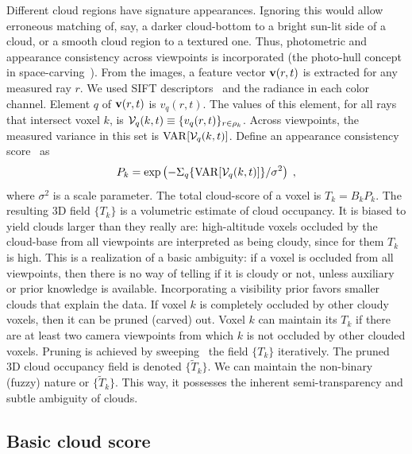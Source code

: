 \documentclass[runningheads]{llncs}
\begin{document}
Different cloud regions have signature appearances. Ignoring this would allow erroneous matching of, say, a darker cloud-bottom to a bright sun-lit side of a cloud, or a smooth cloud region to a textured one. Thus, photometric and appearance consistency across viewpoints is incorporated (the photo-hull concept in space-carving~\cite{Kutulakos2000}).
From the images, a feature vector ${\bf v}(r,t)$ is extracted for any measured ray $r$.
We used SIFT descriptors~\cite{lowe2004distinctive} and the radiance in each color channel. Element $q$ of ${\bf v}(r,t)$ is $v_q(r,t)$. The values of this element, for all rays that intersect voxel $k$, is \mbox{${\cal V}_q(k,t)\equiv\{v_q(r,t)\}_{r\in\rho_k}$}.
Across viewpoints, the measured variance in this set is
${\rm VAR}[{\cal V}_q(k,t)]$. Define an appearance consistency score~\cite{Supp2014} as
\begin{equation}
 P_k= \exp\left(
         -\Sigma_q\{{\rm VAR}[{\cal V}_q(k,t)]\}/\sigma^2
         \right)
  \;,
 \label{eq:Dist}
\end{equation}
where $\sigma^2$ is a scale parameter. The total cloud-score of a voxel is \mbox{$T_k=B_kP_k$}.
The resulting 3D field $\{T_k\}$ is a volumetric estimate of cloud occupancy. It is biased to yield clouds larger than they really are: high-altitude voxels occluded by the cloud-base from all viewpoints are interpreted as being cloudy, since for them $T_k$ is high. This is a realization of a basic ambiguity: if a voxel is occluded from all viewpoints, then there is no way of telling if it is cloudy or not, unless auxiliary or prior knowledge is available. Incorporating a visibility prior favors smaller clouds that explain the data. If voxel $k$ is completely occluded by other cloudy voxels, then it can be pruned (carved) out. Voxel $k$ can maintain its $T_k$ if there are at least two camera viewpoints from which $k$ is not occluded by other clouded voxels. Pruning is achieved by sweeping~\cite{Kutulakos2000} the field $\{T_k\}$ iteratively. The pruned 3D cloud occupancy field is denoted $\{\tilde T_k\}$. We can maintain the non-binary (fuzzy) nature or $\{\tilde T_k\}$. This way, it possesses the inherent semi-transparency and subtle ambiguity of clouds.

\subsection*{Basic cloud score}
\label{sec:cloudscore}
\end{document}
